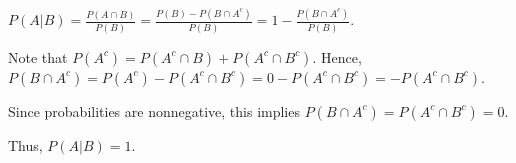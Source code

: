 $P(A | B) = \frac{P(A \cap B)}{P(B)} = \frac{P(B) - P(B \cap A^c)}{P(B)} = 1 - \frac{P(B \cap A^c)}{P(B)}.$

Note that $P(A^c) = P(A^c \cap B) + P(A^c \cap B^c)$.
Hence, $P(B \cap A^c) = P(A^c) - P(A^c \cap B^c) = 0 - P(A^c \cap B^c) = -P(A^c \cap B^c)$.

Since probabilities are nonnegative, this implies $P(B \cap A^c) = P(A^c \cap B^c) = 0$.

Thus, $P(A | B) = 1$.